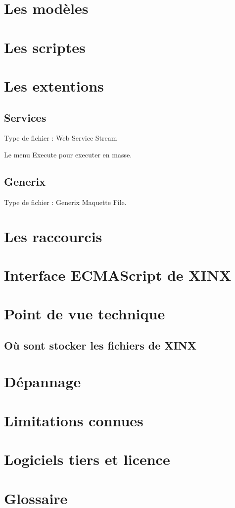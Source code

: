 \documentclass[a4paper,10pt,twoside]{book}
\begin{document}
\chapter{Les modèles}
\label{sec:Snipets}

\chapter{Les scriptes}
\label{sec:Scripts}

\chapter{Les extentions}

\section{Services}
\label{sec:Services}


Type de fichier : Web Service Stream

Le menu Execute pour executer en masse.


\section{Generix}
\label{sec:Generix}

Type de fichier : Generix Maquette File.

\appendix
\chapter{Les raccourcis}

\chapter{Interface ECMAScript de XINX}

\chapter{Point de vue technique}

\section{Où sont stocker les fichiers de XINX}

\chapter{Dépannage}

\chapter{Limitations connues}

\chapter{Logiciels tiers et licence}

\chapter{Glossaire}
\end{document}
